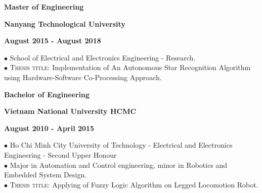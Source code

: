 \documentclass[10pt]{article}
\begin{document}
        \begin{multicols}{3}
            \begin{flushleft}
                \textbf{Master of Engineering}
            \end{flushleft}

            \columnbreak

            \begin{center}
                \textbf{Nanyang Technological University}
            \end{center}

            \columnbreak

            \begin{flushright}
                \textbf{August 2015 - August 2018}
            \end{flushright}
        \end{multicols}

        \vspace{-5mm}

        $\bullet$ {School of Electrical and Electronics Engineering - Research.} \\
        $\bullet$ \textsc{Thesis title}: Implementation of An Autonomous Star Recognition Algorithm using Hardware-Software Co-Processing Approach.


        \begin{multicols}{3}
            \begin{flushleft}
                \textbf{Bachelor of Engineering}
            \end{flushleft}

            \columnbreak

            \begin{center}
                \textbf{Vietnam National University HCMC}
            \end{center}

            \columnbreak

            \begin{flushright}
                \textbf{August 2010 - April 2015}
            \end{flushright}
        \end{multicols}

        \vspace{-5mm}

        $\bullet$ {Ho Chi Minh City University of Technology - Electrical and Electronics Engineering - Second Upper Honour} \\
        $\bullet$ {Major in Automation and Control engineering, minor in Robotics and Embedded System Design.} \\
        $\bullet$ \textsc{Thesis title}: Applying of Fuzzy Logic Algorithm on Legged Locomotion Robot.
\end{document}
